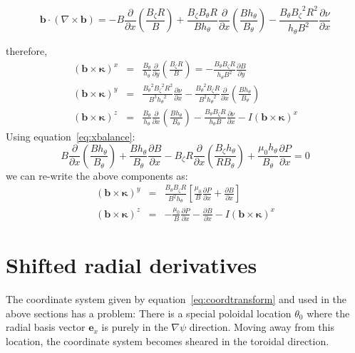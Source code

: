 \documentclass[12pt]{article}
\newcommand{\deriv}[2]{\ensuremath{\frac{\partial #1}{\partial #2}}}
\newcommand{\hthe}{\ensuremath{h_\theta}}
\newcommand{\Bp}{\ensuremath{B_\theta}}
\newcommand{\Bt}{\ensuremath{B_\zeta}}
\newcommand{\Vec}[1]{\ensuremath{\mathbf{#1}}}
\begin{document}
\[
\mathbf{b}\cdot\left(\nabla\times\mathbf{b}\right) = -B\deriv{}{x}\left(\frac{\Bt R}{B}\right) + \frac{\Bt\Bp R}{B\hthe}\deriv{}{x}\left(\frac{B\hthe}{\Bp}\right) - \frac{\Bp\Bt^2R^2}{\hthe B^2}\deriv{\nu}{x}
\]

therefore,
\begin{eqnarray*}
\left(\mathbf{b}\times\mathbf{\kappa}\right)^x &=& \frac{\Bp}{\hthe}\deriv{}{y}\left(\frac{\Bt R}{B}\right) = -\frac{\Bp\Bt R}{\hthe B^2}\deriv{B}{y} \\
\left(\mathbf{b}\times\mathbf{\kappa}\right)^y &=& \frac{\Bp^2\Bt^2 R^2}{B^3\hthe^2}\deriv{\nu}{x} - \frac{\Bp^2\Bt R}{B^2\hthe^2}\deriv{}{x}\left(\frac{B\hthe}{\Bp}\right) \\
\left(\mathbf{b}\times\mathbf{\kappa}\right)^z &=& \frac{\Bp}{\hthe}\deriv{}{x}\left(\frac{B\hthe}{\Bp}\right) - \frac{\Bp\Bt R}{\hthe B}\deriv{\nu}{x} - I\left(\mathbf{b}\times\mathbf{\kappa}\right)^x
\end{eqnarray*}
Using equation~\ref{eq:xbalance}:
\[
B\deriv{}{x}\left(\frac{B\hthe}{\Bp}\right) + \frac{B\hthe}{\Bp}\deriv{B}{x} - \Bt R\deriv{}{x}\left(\frac{\Bt\hthe}{R\Bp}\right) + \frac{\mu_0\hthe}{\Bp}\deriv{P}{x} = 0
\]
we can re-write the above components as:
\begin{eqnarray*}
\left(\mathbf{b}\times\mathbf{\kappa}\right)^y &=& \frac{\Bp\Bt R}{B^2\hthe}\left[\frac{\mu_0}{B}\deriv{P}{x} + \deriv{B}{x}\right] \\
\left(\mathbf{b}\times\mathbf{\kappa}\right)^z &=& -\frac{\mu_0}{B}\deriv{P}{x} - \deriv{B}{x} - I\left(\mathbf{b}\times\mathbf{\kappa}\right)^x
\end{eqnarray*}

\section{Shifted radial derivatives}
\label{sec:shiftcoords}

The coordinate system given by equation~\ref{eq:coordtransform} and used in the
above sections has a problem: There is a special poloidal location $\theta_0$
where the radial basis vector $\Vec{e}_x$ is purely in the $\nabla\psi$ direction.
Moving away from this location, the coordinate system becomes sheared in the toroidal
direction. 
\end{document}
